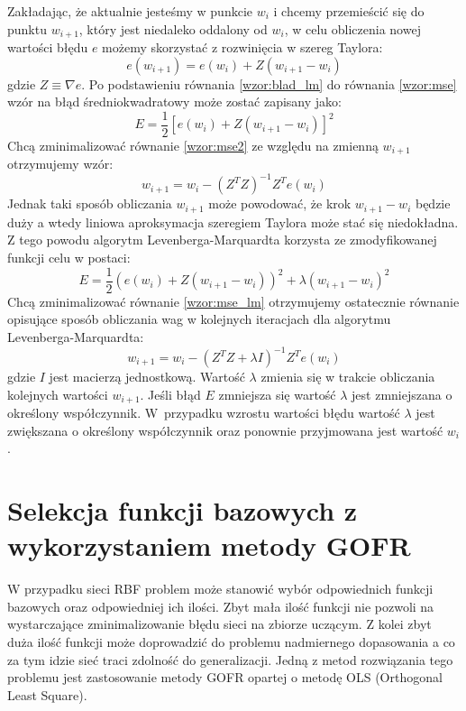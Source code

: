 Zakładając, że aktualnie jesteśmy w punkcie $w_{i}$ i chcemy przemieścić się do punktu $w_{i+1}$, który jest niedaleko oddalony od $w_{i}$, w celu obliczenia nowej wartości błędu $e$ możemy skorzystać z rozwinięcia w szereg Taylora:
\begin{equation}
	\label{wzor:blad_lm}
	e(w_{i+1}) = e(w_{i}) + Z(w_{i+1} - w_{i})
\end{equation}
gdzie $Z \equiv \nabla e$. Po podstawieniu równania \eqref{wzor:blad_lm} do równania \eqref{wzor:mse} wzór na błąd średniokwadratowy może zostać zapisany jako:
\begin{equation}
	\label{wzor:mse2}
	E = \frac{1}{2}[e(w_{i}) + Z(w_{i+1} - w_{i})]^2
\end{equation}
Chcą zminimalizować równanie \eqref{wzor:mse2} ze względu na zmienną $w_{i+1}$ otrzymujemy wzór:
\begin{equation}
	w_{i+1} = w_{i} - (Z^TZ)^{-1}Z^Te(w_{i})
\end{equation}
Jednak taki sposób obliczania $w_{i+1}$ może powodować, że krok $w_{i+1} - w_{i}$ będzie duży a wtedy liniowa aproksymacja szeregiem Taylora może stać się niedokładna. Z tego powodu algorytm Levenberga-Marquardta korzysta ze zmodyfikowanej funkcji celu w postaci:
\begin{equation}
	\label{wzor:mse_lm}
	E = \frac{1}{2}(e(w_{i}) + Z(w_{i+1} - w_{i}))^2 + \lambda (w_{i+1} - w_{i})^2
\end{equation}
Chcą zminimalizować równanie \eqref{wzor:mse_lm} otrzymujemy ostatecznie równanie opisujące sposób obliczania wag w kolejnych iteracjach dla algorytmu Levenberga-Marquardta:
\begin{equation}
	w_{i+1} = w_{i} -(Z^TZ + \lambda I)^{-1}Z^Te(w_{i})
\end{equation}
gdzie $I$ jest macierzą jednostkową. Wartość $\lambda$ zmienia się w trakcie obliczania kolejnych wartości $w_{i+1}$. Jeśli błąd $E$ zmniejsza się wartość $\lambda$ jest zmniejszana o określony współczynnik. W~przypadku wzrostu wartości błędu wartość $\lambda$ jest zwiększana o określony współczynnik oraz ponownie przyjmowana jest wartość $w_i$.



\newpage
\section{Selekcja funkcji bazowych z wykorzystaniem metody GOFR}
W przypadku sieci RBF problem może stanowić wybór odpowiednich funkcji bazowych oraz odpowiedniej ich ilości. Zbyt mała ilość funkcji nie pozwoli na wystarczające zminimalizowanie błędu sieci na zbiorze uczącym. Z kolei zbyt duża ilość funkcji może doprowadzić do problemu nadmiernego dopasowania a co za tym idzie sieć traci zdolność do generalizacji. Jedną z metod rozwiązania tego problemu jest zastosowanie metody GOFR opartej o metodę OLS (Orthogonal Least Square). 

